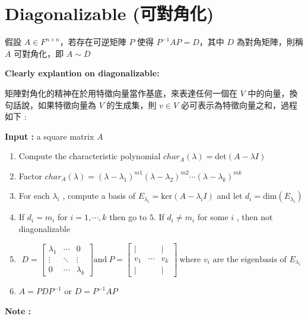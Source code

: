 \documentclass[
]{book}
\providecommand{\tightlist}{%
  \setlength{\itemsep}{0pt}\setlength{\parskip}{0pt}}
\begin{document}
\hypertarget{diagonalizable-ux53efux5c0dux89d2ux5316}{%
\section{Diagonalizable (可對角化)}\label{diagonalizable-ux53efux5c0dux89d2ux5316}}

假設 \(A \in F^{n\times n}\)，若存在可逆矩陣 \(P\) 使得 \(P^{-1}AP = D\)，其中 \(D\) 為對角矩陣，則稱 \(A\) 可對角化，即 \(A \sim D\)

\textbf{Clearly explantion on diagonalizable:}

矩陣對角化的精神在於用特徵向量當作基底，來表達任何一個在 \(V\) 中的向量，換句話說，如果特徵向量為 \(V\) 的生成集，則 \(v \in V\) 必可表示為特徵向量之和，過程如下 :

\textbf{Input :} a square matrix \(A\)

\begin{enumerate}
\def\labelenumi{\arabic{enumi}.}
\tightlist
\item
  Compute the characteristic polynomial \(char_A(\lambda) = \mbox{det}(A - \lambda I)\)
\item
  Factor \(char_A(\lambda) = (\lambda - \lambda_1)^{m1}(\lambda - \lambda_2)^{m2}\cdots(\lambda - \lambda_k)^{mk}\)
\item
  For each \(\lambda_i\) , compute a basis of \(E_{\lambda_i} = \mbox{ker}(A - \lambda_i I)\) and let \(d_i = \mbox{dim}(E_{\lambda_i})\)
\item
  If \(d_i = m_i\) for \(i = 1,\cdots,k\) then go to \(5.\)
  If \(d_i \neq m_i\) for some \(i\) , then not diagonalizable
\item
  \[D = \begin{bmatrix} \lambda_1 & \cdots & 0 \\ \vdots & \ddots & \vdots \\ 0 & \cdots & \lambda_k\end{bmatrix} \mbox{and}\ P = \begin{bmatrix}\mid & & \mid \\ v_1 & \cdots & v_k \\ \mid & & \mid\end{bmatrix} \ \mbox{where $v_i$ are the eigenbasis of $E_{\lambda_i}$}\]
\item
  \(A = PDP^{-1}\) or \(D = P^{-1}AP\)
\end{enumerate}

\textbf{Note :}
\end{document}
